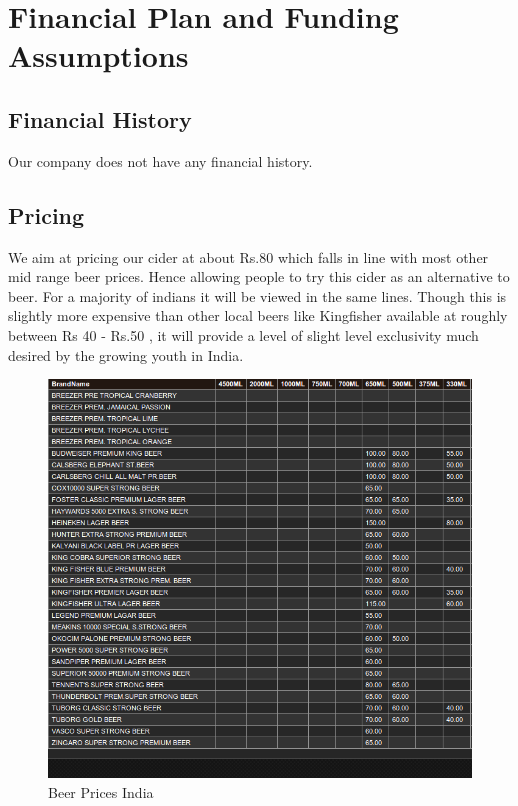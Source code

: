 \documentclass[11pt]{article}
\begin{document}
\newpage


\section{Financial Plan and Funding Assumptions}
  \subsection{Financial History}
Our company does not have any financial history.

	\subsection{Pricing}
We aim at pricing our cider at about Rs.80 which falls in line with most other
mid range beer prices. Hence allowing people to try this cider as an alternative
to beer. For a majority of indians it  will be viewed in the same lines. Though
this is slightly more expensive than other local beers like Kingfisher available
at roughly between Rs 40 - Rs.50 , it will provide a level of slight level
exclusivity much desired by the growing youth in India.

	\begin{figure}[h!]
	\caption{Beer Prices India}
	\centering
	\includegraphics[width=\textwidth]{beerprices.png}
	\end{figure}
\end{document}
